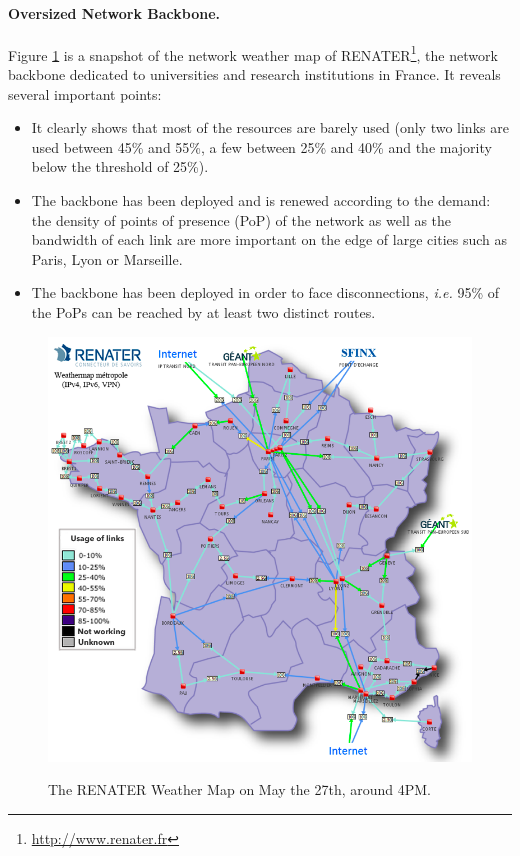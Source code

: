\paragraph{Oversized Network Backbone.}
Figure \ref{fig:renater} is a snapshot of the network weather
map of RENATER\footnote{\href{http://www.renater.fr}{http://www.renater.fr}}, the network backbone dedicated to universities and research
institutions in France. It reveals several important points: 
\begin{itemize} 
\item It clearly shows that most of the resources are barely used (only two links are used between 45\% and 55\%, a few between 25\% and 40\% and the majority below the threshold of 25\%). 
\item The backbone has been deployed and is renewed according to the demand: the density of
points of presence (PoP) of the network as well as the bandwidth of each link are more important on the edge of large cities such as Paris, Lyon or
Marseille. 
\item The backbone has been deployed in order to face disconnections, \textit{i.e.} 95\% of the PoPs can be reached by at least two distinct routes.
\end{itemize}


\begin{figure}[htbp]
\includegraphics[width=12cm]{./FIGS/renater.png}
\vspace*{-.3cm}
\label{fig:renater}
\caption{The RENATER Weather Map on May the 27th, around 4PM.}
\vspace*{-.3cm}
\end{figure}

